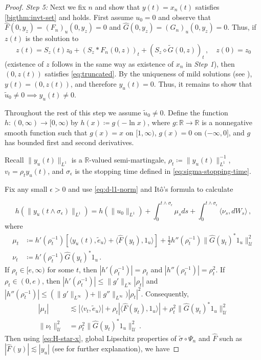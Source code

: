 \documentclass[final]{amsart}
\numberwithin{thm}{section}
\numberwithin{equation}{section}
\newcommand{\U}{\mathcal{U}}
\newcommand{\R}{\mathbb{R}}
\newcommand{\ip}[2]{\langle #1, #2 \rangle}
\begin{document}
\begin{proof}
    
    

    \textit{Step 5:}
    Next we fix $n$ and show that $y(t) = x_n(t)$ satisfies \ref{bigthm:invt-set} and  holds. First assume $u_0 = 0$ and observe that $\hat F(0,y_z) = (F_n)_u(0,y_z) = 0$ and $\hat G(0,y_z) = (G_n)_u(0,y_z) = 0$. Thus, if $z(t)$ is the solution to
    \begin{equation*}
            z(t) = S_z(t) z_0 + (S_z * F_n(0,z))_t + (S_z \diamond \tilde G(0,z))_t\,, \quad z(0) = z_0
    \end{equation*}
    (existence of $z$ follows in the same way as existence of $x_n$ in \textit{Step 1}), then $(0,z(t))$ satisfies \eqref{eq:truncated}. By the uniqueness of mild solutions (see ), $y(t) = (0,z(t))$, and therefore $y_u(t) = 0$. Thus, it remains to show that $\tilde u_0 \neq 0 \implies y_u(t) \neq 0$.
    
    Throughout the rest of this step we assume $\tilde u_0 \neq 0$. 
    Define the function $h: (0,\infty) \to [0,\infty)$ by $h(x) \coloneqq g(-\ln x)$, where $g: \R \to \R$ is a nonnegative smooth function such that  $g(x) = x$ on $[1,\infty)$, $g(x) = 0$ on $(-\infty,0]$, and $g$ has bounded first and second derivatives.
    
    Recall $\|y_u(t)\|_{L^1}$ is a $\R$-valued semi-martingale, $\rho_t \coloneqq \|y_u(t)\|^{-1}_{L^1}$, 
    $v_t = \rho_t y_u(t)$, and $\sigma_\epsilon$ is the stopping time defined in \eqref{eq:sigma-stopping-time}.
    
    Fix any small $\epsilon > 0$ and use \eqref{eq:d-l1-norm} and 
    It\^{o}'s formula to calculate 
    
    \begin{equation}\label{eq:h-ito}
        h(\|y_u(t \wedge \sigma_\epsilon)\|_{L^1}) = h(\|u_0\|_{L^1}) + \int_0^{t\wedge \sigma_\epsilon} \mu_{s }ds + \int_0^{t\wedge \sigma_\epsilon} \ip{\nu_{s}}{dW_s} \,,
    \end{equation}
    where
    \begin{align*}
        \mu_t &\coloneqq h'(\rho_t^{-1})[\ip{y_u(t)}{\tilde e_u} + \ip{\hat F(y_t)}{1_u}] + \frac{1}{2}h''(\rho_t^{-1})\|\hat G(y_t)^*1_u\|_\U^2 \\
        \nu_t &\coloneqq h'(\rho_t^{-1})\hat G(y_t)^*1_u \,.
    \end{align*}
If $\rho_t \in [e, \infty)$ for some $t$, then 
$|h'(\rho_t^{-1})| = \rho_t$ and $|h''(\rho_t^{-1})| = \rho_t^2$. 
If $\rho_t \in (0, e)$, then  
$|h'(\rho_t^{-1})| \leq \|g'\|_{L^\infty}|\rho_t|$ and $|h''(\rho_t^{-1})| \leq (\|g'\|_{L^\infty}) + \|g''\|_{L^\infty})|\rho_t|^2$. Consequently,
    \begin{align*}
         |\mu_t| &\lesssim |\ip{v_t}{\tilde e_u}| + \rho_t|\ip{\hat F(y_t)}{1_u}| + \rho_t^2\|\hat G(y_t)^*1_u\|_\U^2\\
        \|\nu_t\|_\U^2 &=  \rho_t^2\|\hat G(y_t)^*1_u\|_\U^2 \,.
    \end{align*}
Then using \eqref{eq:H-star-x}, global Lipschitz properties of $\tilde \sigma \circ \Psi_n$ and $\hat F$ such as $|\hat F(y)| \lesssim |y_u|$ (see  for further explanation), we have 
    

\end{proof}
\end{document}

